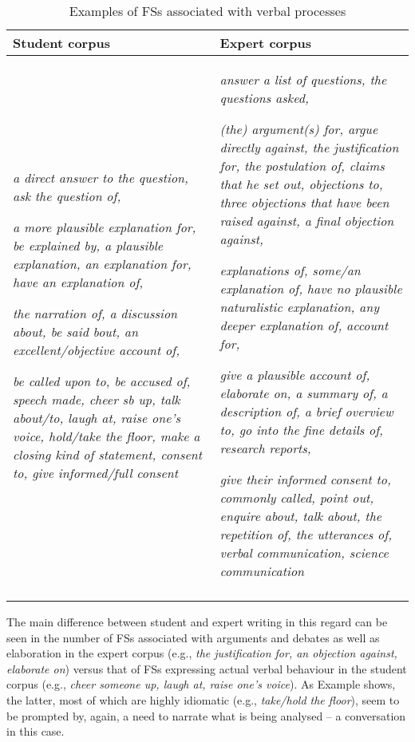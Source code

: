 \documentclass[output=paper]{langscibook}
\begin{document}
\begin{sidewaystable}\small
\begin{tabularx}{\textwidth}{QQ}
\lsptoprule
Student corpus & Expert corpus\\\midrule
\textit{a direct answer to the question, ask the question of,}

\textit{a more plausible explanation for, be explained by, a plausible explanation, an explanation for, have an explanation of,}

\textit{the narration of, a discussion about, be said bout, an excellent/objective account of,}

\textit{be called upon to, be accused of, speech made, cheer sb up, talk about/to, laugh at, raise one’s voice, hold/take the floor, make a closing kind of statement, consent to, give informed/full consent} & \textit{answer a list of questions, the questions asked,}

\textit{(the) argument(s) for, argue directly against, the justification for, the postulation of, claims that he set out, objections to, three objections that have been raised against, a final objection against,}

\textit{explanations of, some/an explanation of, have no plausible naturalistic explanation, any deeper explanation of, account for,}

\textit{give a plausible account of, elaborate on, a summary of, a description of, a brief overview to, go into the fine details of, research reports,}

\textit{give their informed consent to, commonly called, point out, enquire about, talk about, the repetition of, the utterances of, verbal communication, science communication}\\
\lspbottomrule
\end{tabularx}
\caption{Examples of FSs associated with verbal processes\label{tab:wang:7}}
\end{sidewaystable}

The main difference between student and expert writing in this regard can be seen in the number of FSs associated with arguments and debates as well as elaboration in the expert corpus (e.g., \textit{the justification for, an objection against, elaborate on}) versus that of FSs expressing actual verbal behaviour in the student corpus (e.g., \textit{cheer someone up, laugh at, raise one’s voice}). As Example  shows, the latter, most of which are highly idiomatic (e.g., \textit{take/hold the floor}), seem to be prompted by, again, a need to narrate what is being analysed – a conversation in this case.
\end{document}
